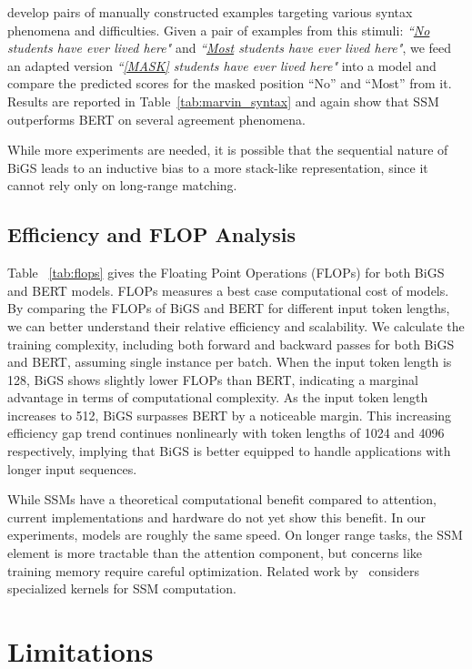 \citet{marvin2018targeted} develop pairs of manually constructed examples targeting various syntax phenomena and difficulties. Given a pair of examples from this stimuli: \emph{``\underline{No} students have ever lived here" } and \emph{``\underline{Most} students have ever lived here"}, we feed an adapted version \emph{``\underline{[MASK]} students have ever lived here"} into a model and compare the predicted scores for the masked position ``No'' and ``Most'' from it. Results are reported in Table~\ref{tab:marvin_syntax} and again show that SSM outperforms BERT on several agreement phenomena. 

While more experiments are needed, it is possible that the sequential nature of BiGS leads to an inductive bias to a more stack-like representation, since it cannot rely only on long-range matching. 

\subsection{Efficiency and FLOP Analysis} Table ~\ref{tab:flops} gives the Floating Point Operations (FLOPs) for both BiGS and BERT models. FLOPs measures a best case computational cost of models. By comparing the FLOPs of BiGS and BERT for different input token lengths, we can better understand their relative efficiency and scalability. We calculate the training complexity, including both forward and backward passes for both BiGS and BERT, assuming single instance per batch. When the input token length is 128, BiGS shows slightly lower FLOPs than BERT, indicating a marginal advantage in terms of computational complexity. As the input token length increases to 512, BiGS surpasses BERT by a noticeable margin. This  increasing efficiency gap trend continues nonlinearly with token lengths of 1024 and 4096 respectively, implying that BiGS is better equipped to handle applications with longer input sequences. 

While SSMs have a theoretical computational benefit compared to attention, current implementations and hardware do not yet show this benefit. In our experiments, models are roughly the same speed. On longer range tasks, the SSM element is more tractable than the attention component, but concerns like training memory require careful optimization. Related work by~\citet{dao2022hungry} considers specialized kernels for SSM computation.

\section{Limitations}

